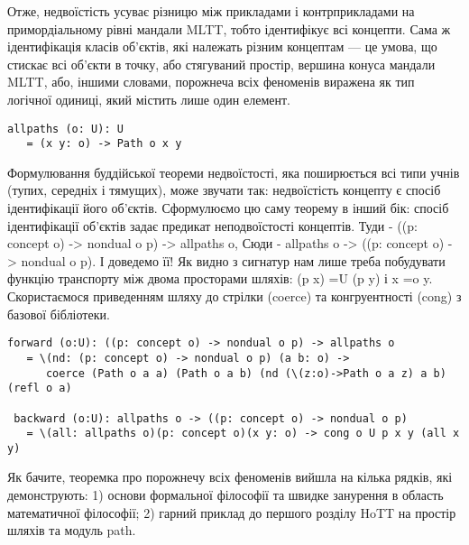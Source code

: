 Отже, недвоїстість усуває різницю між прикладами і контрприкладами
на примордіальному рівні мандали MLTT, тобто ідентифікує всі концепти.
Сама ж ідентифікація класів об'єктів, які належать різним концептам --- це умова,
що стискає всі об'єкти в точку, або стягуваний простір, вершина конуса
мандали MLTT, або, іншими словами, порожнеча всіх феноменів виражена
як тип логічної одиниці, який містить лише один елемент.

\begin{lstlisting}
allpaths (o: U): U
   = (x y: o) -> Path o x y
\end{lstlisting}

Формулювання буддійської теореми недвоїстості, яка поширюється
всі типи учнів (тупих, середніх і тямущих), може звучати так:
недвоїстість концепту є спосіб ідентифікації його об'єктів. Сформулюємо
цю саму теорему в інший бік: спосіб ідентифікації об'єктів задає
предикат неподвоїстості концептів. Туди - ((p: concept o) -> nondual o p) -> allpaths o,
Сюди - allpaths o -> ((p: concept o) -> nondual o p). І доведемо її!
Як видно з сигнатур нам лише треба побудувати функцію транспорту між
двома просторами шляхів: (p x) =U (p y) і x =o y. Скористаємося
приведенням шляху до стрілки (coerce) та конгруентності (cong) з
базової бібліотеки.

\begin{lstlisting}
forward (o:U): ((p: concept o) -> nondual o p) -> allpaths o
   = \(nd: (p: concept o) -> nondual o p) (a b: o) ->
      coerce (Path o a a) (Path o a b) (nd (\(z:o)->Path o a z) a b) (refl o a)

 backward (o:U): allpaths o -> ((p: concept o) -> nondual o p)
   = \(all: allpaths o)(p: concept o)(x y: o) -> cong o U p x y (all x y)
\end{lstlisting}

Як бачите, теоремка про порожнечу всіх феноменів вийшла на кілька рядків,
які демонструють: 1) основи формальної філософії та швидке занурення в
область математичної філософії; 2) гарний приклад до першого розділу
HoTT на простір шляхів та модуль path.



